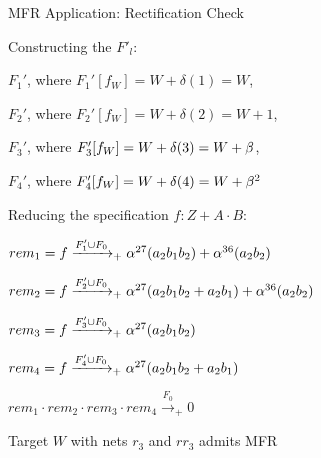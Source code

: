 \begin{frame}{\large MFR Application: Rectification Check}
\bi
	\item Constructing the $F'_l$:
	\bi
		\item {$F_1'$, where $F_1'[f_W]=W+\delta(1)=W$},
		\item {$F_2'$, where $F_2'[f_W]=W+\delta(2)=W+1$},
		\item {$F_3'$, where $F_3'[f_W]=W+\delta(3)=W+\beta$},
		\item {$F_4'$, where $F_4'[f_W]=W+\delta(4)=W+\beta^2$}
	\ei
	\vspace{0.1in}
	\pause
	\item Reducing the specification $f: Z+A\cdot B$:
\bi
\item $rem_1 = f \xrightarrow[]{F_1'\cup F_{0}}_+{\alpha^{27} (a_2b_1b_2)+\alpha^{36} (a_2b_2)}$
\item $rem_2 = f \xrightarrow[]{F_2'\cup F_{0}}_+{\alpha^{27} (a_2b_1b_2+a_2b_1)+\alpha^{36} (a_2b_2)}$
\item $rem_3 = f \xrightarrow[]{F_3'\cup F_{0}}_+{\alpha^{27} (a_2b_1b_2)}$
\item $rem_4 = f \xrightarrow[]{F_4'\cup F_{0}}_+{\alpha^{27} (a_2b_1b_2+a_2b_1)}$
\ei \pause
	\item $rem_1\cdot rem_2 \cdot rem_3 \cdot rem_4 \xrightarrow{F_0}_+0$
	\item Target $W$ with nets $r_3$ and $rr_3$ admits MFR
\ei
\end{frame}







